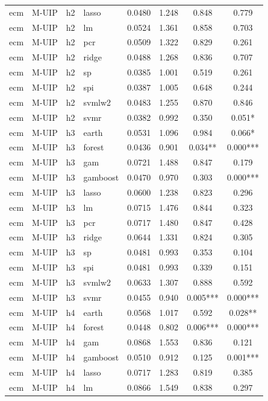 \begin{ThreePartTable}
\begin{longtable}[t]{llclcccc}
ecm & M-UIP & h2 & lasso & 0.0480 & 1.248 & 0.848 & 0.779\\
ecm & M-UIP & h2 & lm & 0.0524 & 1.361 & 0.858 & 0.703\\
ecm & M-UIP & h2 & pcr & 0.0509 & 1.322 & 0.829 & 0.261\\
ecm & M-UIP & h2 & ridge & 0.0488 & 1.268 & 0.836 & 0.707\\
ecm & M-UIP & h2 & sp & 0.0385 & 1.001 & 0.519 & 0.261\\
ecm & M-UIP & h2 & spi & 0.0387 & 1.005 & 0.648 & 0.244\\
ecm & M-UIP & h2 & svmlw2 & 0.0483 & 1.255 & 0.870 & 0.846\\
ecm & M-UIP & h2 & svmr & 0.0382 & 0.992 & 0.350 & 0.051*\\
\addlinespace
ecm & M-UIP & h3 & earth & 0.0531 & 1.096 & 0.984 & 0.066*\\
ecm & M-UIP & h3 & forest & 0.0436 & 0.901 & 0.034** & 0.000***\\
ecm & M-UIP & h3 & gam & 0.0721 & 1.488 & 0.847 & 0.179\\
ecm & M-UIP & h3 & gamboost & 0.0470 & 0.970 & 0.303 & 0.000***\\
ecm & M-UIP & h3 & lasso & 0.0600 & 1.238 & 0.823 & 0.296\\
ecm & M-UIP & h3 & lm & 0.0715 & 1.476 & 0.844 & 0.323\\
ecm & M-UIP & h3 & pcr & 0.0717 & 1.480 & 0.847 & 0.428\\
ecm & M-UIP & h3 & ridge & 0.0644 & 1.331 & 0.824 & 0.305\\
ecm & M-UIP & h3 & sp & 0.0481 & 0.993 & 0.353 & 0.104\\
ecm & M-UIP & h3 & spi & 0.0481 & 0.993 & 0.339 & 0.151\\
ecm & M-UIP & h3 & svmlw2 & 0.0633 & 1.307 & 0.888 & 0.592\\
ecm & M-UIP & h3 & svmr & 0.0455 & 0.940 & 0.005*** & 0.000***\\
\addlinespace
ecm & M-UIP & h4 & earth & 0.0568 & 1.017 & 0.592 & 0.028**\\
ecm & M-UIP & h4 & forest & 0.0448 & 0.802 & 0.006*** & 0.000***\\
ecm & M-UIP & h4 & gam & 0.0868 & 1.553 & 0.836 & 0.121\\
ecm & M-UIP & h4 & gamboost & 0.0510 & 0.912 & 0.125 & 0.001***\\
ecm & M-UIP & h4 & lasso & 0.0717 & 1.283 & 0.819 & 0.385\\
ecm & M-UIP & h4 & lm & 0.0866 & 1.549 & 0.838 & 0.297\\

\end{longtable}
\end{ThreePartTable}
